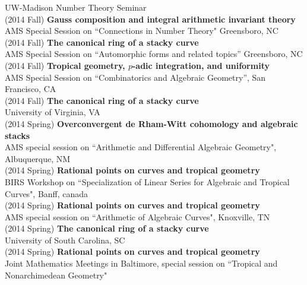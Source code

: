 \documentclass[margin,line]{res}
\begin{document}
\begin{resume}
UW-Madison Number Theory Seminar
\vspace{.05cm}\\
(2014 Fall) \textbf{Gauss composition and integral arithmetic invariant theory}\\  
AMS Special Session on  ``Connections in Number Theory" Greensboro, NC
\vspace{.05cm}\\
(2014 Fall) \textbf{The canonical ring of a stacky curve}\\
AMS Special Session on ``Automorphic forms and related topics'' Greensboro, NC
\vspace{.05cm}\\
(2014 Fall) \textbf{Tropical geometry, $p$-adic integration, and uniformity}\\
AMS Special Session on ``Combinatorics and Algebraic Geometry'', San Francisco, CA
\vspace{.05cm}\\
(2014 Fall) \textbf{The canonical ring of a stacky curve}\\  
University of Virginia, VA
\vspace{.05cm}\\
(2014 Spring) \textbf{Overconvergent de Rham-Witt cohomology and algebraic stacks}\\  
AMS special session on ``Arithmetic and Differential Algebraic Geometry", Albuquerque, NM
\vspace{.05cm}\\
(2014 Spring) \textbf{Rational points on curves and tropical geometry}\\  
BIRS Workshop on ``Specialization of Linear Series for Algebraic and Tropical Curves", Banff, canada
\vspace{.05cm}\\
(2014 Spring) \textbf{Rational points on curves and tropical geometry}\\  
AMS special session on ``Arithmetic of Algebraic Curves", Knoxville, TN
\vspace{.05cm}\\
(2014 Spring) \textbf{The canonical ring of a stacky curve}\\  
University of South Carolina, SC
\vspace{.05cm}\\
(2014 Spring) \textbf{Rational points on curves and tropical geometry}\\  
Joint Mathematics Meetings in Baltimore, special session on ``Tropical and Nonarchimedean Geometry"  
\vspace{.05cm}\\

\end{resume}
\end{document}
